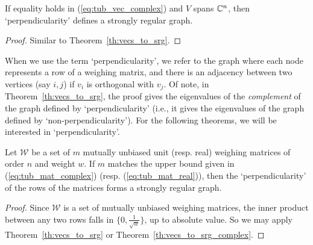 \begin{theorem}\label{th:vecs_to_srg_complex}
 If equality holds in (\ref{eq:tub_vec_complex}) and $V$ spans $\mathbb{C}^n$, then `perpendicularity' defines a strongly regular graph.

 \begin{proof}
  Similar to Theorem~\ref{th:vecs_to_srg}.
 \end{proof}

\end{theorem}

When we use the term `perpendicularity', we refer to the graph where each node represents a row of a weighing matrix, and there is an adjacency between two vertices (say $i,j$) if $v_i$ is orthogonal with $v_j$. Of note, in Theorem~\ref{th:vecs_to_srg}, the proof gives the eigenvalues of the {\it complement} of the graph defined by `perpendicularity' (i.e., it gives the eigenvalues of the graph defined by `non-perpendicularity'). For the following theorems, we will be interested in `perpendicularity'.

\begin{corollary}\label{cor:mat_to_srg}
 Let $\mathcal{W}$ be a set of $m$ mutually unbiased unit (resp. real) weighing matrices of order $n$ and weight $w$. If $m$ matches the upper bound given in (\ref{eq:tub_mat_complex}) (resp. (\ref{eq:tub_mat_real})), then the `perpendicularity' of the rows of the matrices forms a strongly regular graph.

 \begin{proof}
  Since $\mathcal{W}$ is a set of mutually unbiased weighing matrices, the inner product between any two rows falls in $\{0,\frac{1}{\sqrt{w}}\}$, up to absolute value. So we may apply Theorem~\ref{th:vecs_to_srg} or Theorem~\ref{th:vecs_to_srg_complex}.
 \end{proof}

\end{corollary}


